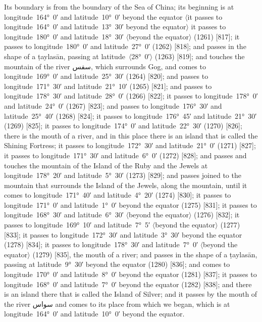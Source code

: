 \documentclass[11pt]{article}
\newcommand{\Pg}[1]{\marginpar{\footnotesize #1}}
\newcommand{\Ang}[1]{\ensuremath{#1}}
\begin{document}
Its boundary is from the boundary of the Sea of China; its beginning is at longitude~164°~0′ and latitude~10°~0′ beyond the equator \Ang{\langle}it passes to longitude~164°~0′ and latitude~13°~30′ beyond the equator\Ang{\rangle} it passes to longitude~180°~0′ and latitude~18°~30′ \Ang{\langle}beyond the equator\Ang{\rangle} (1261) [817]; it passes to longitude~180°~0′ and latitude~27°~0′ (1262) [818]; and passes in the shape of a ṭaylasān, passing at latitude~\Ang{\langle}28°~0′\Ang{\rangle} (1263) [819]; and touches the mountain of the river \textarabic{سفس}, which surrounds Gog, and comes to longitude~169°~0′ and latitude~25°~30′ (1264) [820]; and passes to longitude~171°~30′ and latitude~21°~10′ (1265) [821]; and passes to longitude~178°~30′ and latitude~28°~0′ (1266) [822]; it passes to longitude~178°~0′ and latitude~24°~0′ (1267) [823]; and passes to longitude~176°~30′ and latitude~25°~40′ (1268) [824]\Pg{p. 83}; it passes to longitude~176°~45′ and latitude~21°~30′ (1269) [825]; it passes to longitude~174°~0′ and latitude~22°~30′ (1270) [826]; there is the mouth of a river, and in this place there is an island that is called the Shining Fortress; it passes to longitude~172°~30′ and latitude~21°~0′ (1271) [827]; it passes to longitude~171°~30′ and latitude~6°~0′ (1272) [828]; and passes and touches the mountain of the Island of the Ruby and the Jewels at longitude~178°~20′ and latitude~5°~30′ (1273) [829]; and passes joined to the mountain that surrounds the Island of the Jewels, along the mountain, until it comes to longitude~171°~40′ and latitude~4°~20′ (1274) [830]; it passes to longitude~171°~0′ and latitude~1°~0′ beyond the equator (1275) [831]; it passes to longitude~168°~30′ and latitude~6°~30′ \Ang{\langle}beyond the equator\Ang{\rangle} (1276) [832]; it passes to longitude~169°~10′ and latitude~7°~5′ \Ang{\langle}beyond the equator\Ang{\rangle} (1277) [833]; it passes to longitude~172°~30′ and latitude~3°~30′ beyond the equator (1278) [834]; it passes to longitude~178°~30′ and latitude~7°~0′ \Ang{\langle}beyond the equator\Ang{\rangle} (1279) [835], the mouth of a river; and passes in the shape of a ṭaylasān, passing at latitude~9°~30′ beyond the equator (1280) [836]; and comes to longitude~170°~0′ and latitude~8°~0′ beyond the equator (1281) [837]; it passes to longitude~168°~0′ and latitude~7°~0′ beyond the equator (1282) [838]; and there is an island there that is called the Island of Silver; and it passes by the mouth of the river \textarabic{سواس} and comes to its place from which we began, which is at longitude~164°~0′ and latitude~10°~0′ beyond the equator.
\end{document}
